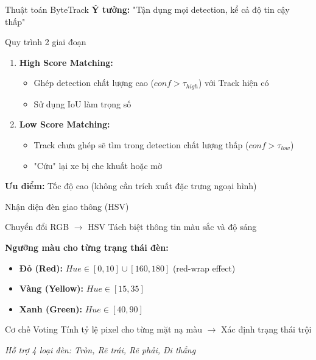 \begin{frame}{Thuật toán ByteTrack}
    \textbf{Ý tưởng:} "Tận dụng mọi detection, kể cả độ tin cậy thấp"

    \begin{block}{Quy trình 2 giai đoạn}
    \begin{enumerate}
        \item \textbf{High Score Matching:}
        \begin{itemize}
            \item Ghép detection chất lượng cao ($conf > \tau_{high}$) với Track hiện có
            \item Sử dụng IoU làm trọng số
        \end{itemize}
        \item \textbf{Low Score Matching:}
        \begin{itemize}
            \item Track chưa ghép sẽ tìm trong detection chất lượng thấp ($conf > \tau_{low}$)
            \item "Cứu" lại xe bị che khuất hoặc mờ
        \end{itemize}
    \end{enumerate}
    \end{block}

    \textbf{Ưu điểm:} Tốc độ cao (không cần trích xuất đặc trưng ngoại hình)
\end{frame}

\begin{frame}{Nhận diện đèn giao thông (HSV)}
    \begin{block}{Chuyển đổi RGB $\rightarrow$ HSV}
    Tách biệt thông tin màu sắc và độ sáng
    \end{block}

    \textbf{Ngưỡng màu cho từng trạng thái đèn:}
    \begin{itemize}
        \item \textbf{Đỏ (Red):} $Hue \in [0, 10] \cup [160, 180]$ (red-wrap effect)
        \item \textbf{Vàng (Yellow):} $Hue \in [15, 35]$
        \item \textbf{Xanh (Green):} $Hue \in [40, 90]$
    \end{itemize}

    \begin{block}{Cơ chế Voting}
    Tính tỷ lệ pixel cho từng mặt nạ màu $\rightarrow$ Xác định trạng thái trội
    \end{block}

    \textit{Hỗ trợ 4 loại đèn: Tròn, Rẽ trái, Rẽ phải, Đi thẳng}
\end{frame}

